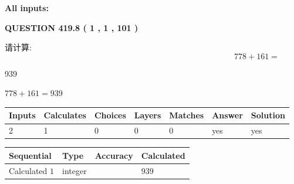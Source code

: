 \documentclass{ctexart}
\begin{document}
   
   
   
\noindent\vspace{0.1in}\hspace{-0.08in} {\textbf{\Large{All inputs: }}}
   
   
  
\vspace{0.2in}
  
{\textbf{\Large{QUESTION
419.8 
 ( 1 , 1 , 101 )
}}}
  
  
 
请计算:
\begin{equation}
778 +  %
161 = \nonumber
\end{equation}
 
 
 
\noindent{}
 
 

939
 
 
\noindent{}
 
 

 
 
 
\noindent{}
 
 

$ %
778 +  %
161=   %
939$
 
 
\noindent{}
 
 

 
   
   
   
   
\noindent\begin{tabular}{|l|l|l|l|l|l|l|}
 \hline
Inputs & Calculates & Choices & Layers & Matches & Answer & Solution \\ \hline
 2  & 
 1  & 
 0
  & 
 0  & 
 0  & 
  yes & 
  yes 
  \\ \hline
 \end{tabular}
   
   
   
   
\noindent{}
   
   
  
  
\noindent\begin{tabular}{|l|l|l|l|}
\hline
 Sequential & Type & Accuracy & Calculated \\ 
\hline
 
 
  Calculated $  1 $ & integer &  & 
  $ 939 $ 
 \\  \hline  
 \end{tabular}
   
\end{document}
